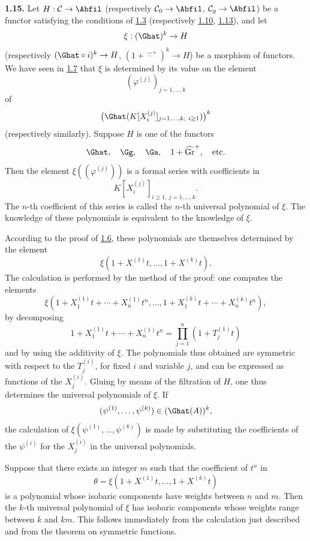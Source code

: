 \textbf{1.15.} Let \(H:\mathcal C\to\Abfil\) (respectively \(\mathcal C_0\to\Abfil\), \(\mathcal C_g\to\Abfil\)) be a functor satisfying the conditions of \hyperlink{sga6.e05.para.1-3}{1.3} (respectively \hyperlink{sga6.e05.thm.1-10}{1.10}, \hyperlink{sga6.e05.thm.1-13}{1.13}), and let
\[
  \xi:(\Ghat)^k\to H
\]
(respectively \((\Ghat\circ i)^k\to H\), \((1+\widehat{\,\cdot\,}^{+})^k\to H\)) be a morphism of functors. We have seen in \hyperlink{sga6.e05.para.1-7}{1.7} that \(\xi\) is determined by its value on the element
\[
  (\varphi^{(j)})_{j=1,\ldots,k}
\]
of
\[
  \bigl(\Ghat(K[X_i^{(j)}]_{j=1,\ldots,k;\ i\geq 1})\bigr)^k
\]
(respectively similarly). Suppose \(H\) is one of the functors
\[
  \Ghat,\quad \Gg,\quad \Ga,\quad 1+\widehat{\operatorname{Gr}}^{+},\quad\text{etc.}
\]
Then the element \(\xi((\varphi^{(j)}))\) is a formal series with coefficients in
\[
  K[X_i^{(j)}]_{i\geq 1,\ j=1,\ldots,k}.
\]
The \(n\)-th coefficient of this series is called the \(n\)-th universal polynomial of \(\xi\). The knowledge of these polynomials is equivalent to the knowledge of \(\xi\).

According to the proof of \hyperlink{sga6.e05.thm.1-6}{1.6}, these polynomials are themselves determined by the element
\[
  \xi(1+X^{(1)}t,\ldots,1+X^{(k)}t).
\]
The calculation is performed by the method of the proof: one computes the elements
\[
  \xi(1+X_1^{(1)}t+\cdots+X_n^{(1)}t^n,\ldots,
        1+X_1^{(k)}t+\cdots+X_n^{(k)}t^n),
\]
by decomposing
\[
  1+X_1^{(1)}t+\cdots+X_n^{(1)}t^n
  =\prod_{j=1}^n(1+T_j^{(1)}t)
\]
and by using the additivity of \(\xi\). The polynomials thus obtained are symmetric with respect to the \(T_j^{(i)}\), for fixed \(i\) and variable \(j\), and can be expressed as functions of the \(X_j^{(i)}\). Gluing by means of the filtration of \(H\), one thus determines the universal polynomials of \(\xi\). If
\[
  (\psi^{(1)},\ldots,\psi^{(k)})\in(\Ghat(A))^k,
\]
the calculation of \(\xi(\psi^{(1)},\ldots,\psi^{(k)})\) is made by substituting the coefficients of the \(\psi^{(i)}\) for the \(X_j^{(i)}\) in the universal polynomials.

Suppose that there exists an integer \(m\) such that the coefficient of \(t^n\) in
\[
  \theta=\xi(1+X^{(1)}t,\ldots,1+X^{(k)}t)
\]
is a polynomial whose isobaric components have weights between \(n\) and \(m\). Then the \(k\)-th universal polynomial of \(\xi\) has isobaric components whose weights range between \(k\) and \(km\). This follows immediately from the calculation just described and from the theorem on symmetric functions.

